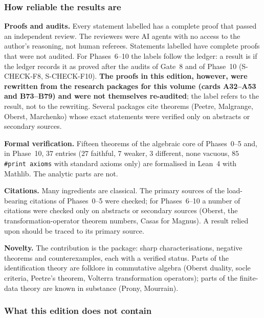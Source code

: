 \subsubsection{How reliable the results are}

\textbf{Proofs and audits.} Every statement labelled \proved{} has a complete proof that passed an independent review. The reviewers were AI agents with no access to the author's reasoning, not human referees. Statements labelled \pw{} have complete proofs that were not audited. For Phases~6--10 the labels follow the ledger: a result is \proved{} if the ledger records it as proved after the audits of Gate~8 and of Phase~10 (S-CHECK-F8, S-CHECK-F10). \textbf{The proofs in this edition, however, were rewritten from the research packages for this volume (cards A32--A53 and B73--B79) and were not themselves re-audited}; the label refers to the result, not to the rewriting. Several packages cite theorems (Peetre, Malgrange, Oberst, Marchenko) whose exact statements were verified only on abstracts or secondary sources.

\textbf{Formal verification.} Fifteen theorems of the algebraic core of Phases~0--5 and, in Phase~10, $37$ entries ($27$ faithful, $7$ weaker, $3$ different, none vacuous, $85$ \texttt{\#print axioms} with standard axioms only) are formalised in Lean~4 with Mathlib. The analytic parts are not.

\textbf{Citations.} Many ingredients are classical. The primary sources of the load-bearing citations of Phases~0--5 were checked; for Phases~6--10 a number of citations were checked only on abstracts or secondary sources (Oberst, the transformation-operator theorem numbers, Casas for Magnus). A result relied upon should be traced to its primary source.

\textbf{Novelty.} The contribution is the package: sharp characterisations, negative theorems and counterexamples, each with a verified status. Parts of the identification theory are folklore in commutative algebra (Oberst duality, socle criteria, Peetre's theorem, Volterra transformation operators); parts of the finite-data theory are known in substance (Prony, Mourrain).

\subsubsection{What this edition does not contain}

